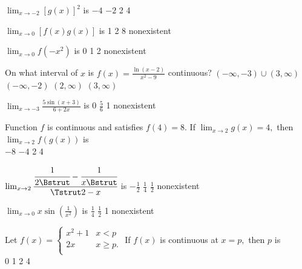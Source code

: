 \begin{question}
\(\lim_{x \to -2} [g(x)]^2\) is 
\choicesline
{\(-4\)}
{\(-2\)}
{2}
{4}
{}
\end{question}

\begin{question}
\(\lim_{x \to 0} [f(x) g(x)]\) is 
\choicesline
{1}
{2}
{}
{8}
{nonexistent}
\end{question}

\begin{question}
\label{q:graph-end}
\(\lim_{x \to 0} f(-x^2)\) is 
\choicesline
{0}
{1}
{2}
{}
{nonexistent}
\end{question}

\begin{question}
On what interval of \(x\) is \(f(x) = \frac{\ln(x - 2)}{x^2 - 9}\) continuous?
\choices
{\((-\infty, -3)\cup(3, \infty)\)}
{\((-\infty, -2)\)}
{\((2, \infty)\)}
{\((3, \infty)\)}
{}
\end{question}

\begin{question}
\(\lim_{x \to -3} \frac{5\sin(x + 3)}{6 + 2x}\) is 
\choicesline
{0}
{\(\frac{5}{6}\)}
{1}
{}
{nonexistent}
\end{question}

\begin{question}
Function \(f\) is continuous and satisfies \(f(4) = 8.\) If \(\lim_{x \to 2} g(x) = 4,\) then \(\lim_{x \to 2} f(g(x))\) is \\
\choicesline
{\(-8\)}
{\(-4\)}
{2}
{4}
{}
\end{question}

\begin{question}
\(\lim_{x \to 2} \cfrac{\cfrac{1}{2 \Bstrut} - \cfrac{1}{x \Bstrut} }{\Tstrut 2 - x}\) is
\choicesline
{\(-\frac{1}{2}\)}
{}
{\(\frac{1}{4}\)}
{\(\frac{1}{2}\)}
{nonexistent}
\end{question}

\begin{question}
\(\lim_{x \to 0} x \sin\left( \frac{1}{x^2}\right)\) is 
\choicesline
{}
{\(\frac{1}{4}\)}
{\(\frac{1}{2}\)}
{1}
{nonexistent}
\end{question}

\begin{question}
Let
\(f(x)= \begin{cases} 
x^2 + 1& x < p \\
2x & x \geqslant p. \\ 
\end{cases} 
\)
If \(f(x)\) is continuous at \(x = p,\) then \(p\) is \\
\choicesline
{}
{0}
{1}
{2}
{4}
\end{question}

